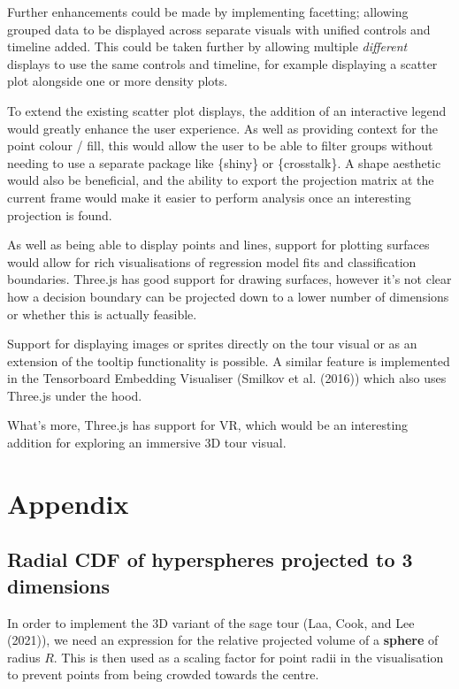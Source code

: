 Further enhancements could be made by implementing facetting; allowing grouped data to be displayed across separate visuals with unified controls and timeline added. This could be taken further by allowing multiple \emph{different} displays to use the same controls and timeline, for example displaying a scatter plot alongside one or more density plots.

To extend the existing scatter plot displays, the addition of an interactive legend would greatly enhance the user experience. As well as providing context for the point colour / fill, this would allow the user to be able to filter groups without needing to use a separate package like \{shiny\} or \{crosstalk\}. A shape aesthetic would also be beneficial, and the ability to export the projection matrix at the current frame would make it easier to perform analysis once an interesting projection is found.

As well as being able to display points and lines, support for plotting surfaces would allow for rich visualisations of regression model fits and classification boundaries. Three.js has good support for drawing surfaces, however it's not clear how a decision boundary can be projected down to a lower number of dimensions or whether this is actually feasible.

Support for displaying images or sprites directly on the tour visual or as an extension of the tooltip functionality is possible. A similar feature is implemented in the Tensorboard Embedding Visualiser (Smilkov et al. (2016)) which also uses Three.js under the hood.

What's more, Three.js has support for VR, which would be an interesting addition for exploring an immersive 3D tour visual.

\hypertarget{appendix}{%
\section{Appendix}\label{appendix}}

\hypertarget{app:a}{%
\subsection{Radial CDF of hyperspheres projected to 3 dimensions}\label{app:a}}

In order to implement the 3D variant of the sage tour (Laa, Cook, and Lee (2021)), we need an expression for the relative projected volume of a \textbf{sphere} of radius \(R\). This is then used as a scaling factor for point radii in the visualisation to prevent points from being crowded towards the centre.

